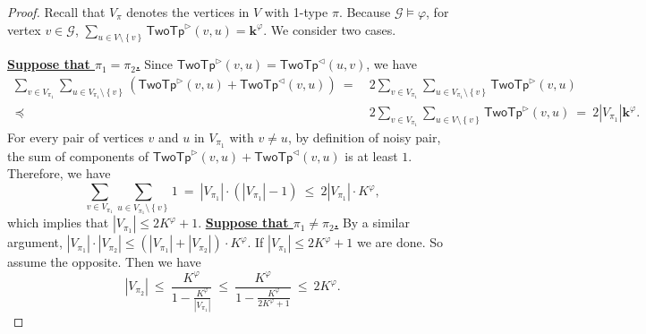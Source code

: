 \documentclass[10pt,a4paper]{article}
\theoremstyle{definition}
\theoremstyle{remark}
\newcommand{\cG}{\mathcal{G}}
\newcommand{\bfk}{\mathbf{k}}
\newcommand{\twotypeof}{\mathsf{TwoTp}}
\newcommand{\set}[1]         {\left\{ #1 \right\}}
\newcommand{\abs}[1]         {{\left| #1 \right|}}
\newcommand{\vle} {\preccurlyeq}
\newcommand{\trif} {\triangleright}
\newcommand{\trib} {\triangleleft}
\begin{document}
\begin{proof}
    
    Recall that $V_{\pi}$ denotes the vertices in $V$ with 1-type $\pi$.
    Because $\cG \models \varphi$, for vertex $v \in \cG$,
    $\sum_{u \in V \setminus \set{v}} \twotypeof^\trif(v, u) = \bfk^\varphi$.
    We consider two cases.

    \textbf{\uline{Suppose that $\pi_1 = \pi_2$.}}
    Since $\twotypeof^\trif(v, u) = \twotypeof^\trib(u, v)$,
    we have
    \begin{equation*}
        \begin{aligned}
            \sum_{v \in V_{\pi_1}} \sum_{u \in V_{\pi_1} \setminus \set{v}}
            (\twotypeof^\trif(v, u) + \twotypeof^\trib(v, u))
            \ =\ &
            2 \sum_{v \in V_{\pi_1}} \sum_{u \in V_{\pi_1} \setminus \set{v}}
            \twotypeof^\trif(v, u) \\
            \ \vle\ &
            2 \sum_{v \in V_{\pi_1}} \sum_{u \in V \setminus \set{v}} \twotypeof^\trif(v, u)
            \ =\ 2\abs{V_{\pi_1}} \bfk^\varphi.
        \end{aligned}
    \end{equation*}
    For every pair of vertices $v$ and $u$ in $V_{\pi_1}$ with $v \neq u$,
    by definition of noisy pair,
    the sum of components of $\twotypeof^\trif(v, u) + \twotypeof^\trib(v, u)$ is at least $1$.
    Therefore, we have
    \begin{equation*}
        \sum_{v \in V_{\pi_1}} \sum_{u \in V_{\pi_1} \setminus \set{v}} 1
        \ =\ \abs{V_{\pi_1}}\cdot(\abs{V_{\pi_1}} - 1)
        \ \le\ 2\abs{V_{\pi_1}} \cdot K^\varphi,
    \end{equation*}
    which implies that $\abs{V_{\pi_1}} \le 2K^\varphi + 1$.     
    \textbf{\uline{Suppose that $\pi_1 \neq \pi_2$.}}
    By a similar argument, 
    $\abs{V_{\pi_1}} \cdot \abs{V_{\pi_2}} \le (\abs{V_{\pi_1}} + \abs{V_{\pi_2}}) \cdot K^\varphi$.
    If $\abs{V_{\pi_1}} \leq 2K^\varphi+1$ we are done. So assume the opposite.
    Then we have
    \begin{equation*}
        \abs{V_{\pi_2}}
        \ \le\ 
        \frac{K^\varphi}{1-\frac{K^\varphi}{\abs{V_{\pi_1}}}}
        \ \le\ 
        \frac{K^\varphi}{1-\frac{K^\varphi}{2K^\varphi + 1}}
        \ \le\ 
        2K^\varphi.
    \end{equation*}
\end{proof}
\end{document}
